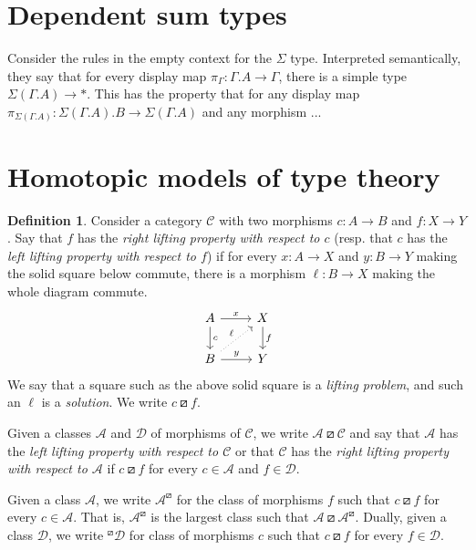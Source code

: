 \documentclass{article}
\theoremstyle{definition}
\newtheorem{definition}{Definition}[section]
\newcommand{\C}{\mathcal C}
\newcommand{\D}{\mathcal D}
\newcommand{\A}{\mathcal A}
\begin{document}
\section{Dependent sum types}

Consider the rules in the empty context for the $\Sigma$ type. Interpreted semantically, they say that for every display map $\pi_\Gamma : \Gamma. A \to \Gamma$, there is a simple type $\Sigma (\Gamma. A) \to *$. This has the property that for any display map $\pi_{\Sigma (\Gamma. A)} : \Sigma (\Gamma. A) . B \to \Sigma (\Gamma. A)$ and any morphism ...

\section{Homotopic models of type theory}

\begin{definition}
    Consider a category $\C$ with two morphisms $c: A \to B$ and $f: X \to Y$. Say that $f$ has the \emph{right lifting property with respect to $c$} (resp. that $c$ has the \emph{left lifting property with respect to $f$}) if for every $x : A \to X$ and $y : B \to Y$ making the solid square below commute, there is a morphism $\ell: B \to X$ making the whole diagram commute.
    \[
         \begin{tikzcd}
             A \ar[r,"x"] \ar[d,"c"] & X \ar[d,"f"]
             \\ 
             B \ar[r,"y"] \ar[ur,"\ell",dotted] & Y
         \end{tikzcd}
    \]
    We say that a square such as the above solid square is a \emph{lifting problem}, and such an $\ell$ is a \emph{solution}. We write $c \boxslash f$.

    Given a classes $\A$ and $\D$ of morphisms of $\C$, we write $\A \boxslash \C$ and say that $\A$ has the \emph{left lifting property with respect to $\C$} or that $\C$ has the \emph{right lifting property with respect to $\A$} if $c \boxslash f$ for every $c \in \A$ and $f \in \D$.

    Given a class $\A$, we write $\A^\boxslash$ for the class of morphisms $f$ such that $c \boxslash f$ for every $c \in \A$. That is, $\A^\boxslash$ is the largest class such that $\A \boxslash \A^\boxslash$. Dually, given a class $\D$, we write $^\boxslash \D$ for class of morphisms $c$ such that $c \boxslash f$ for every $f \in \D$.
\end{definition}
\end{document}
